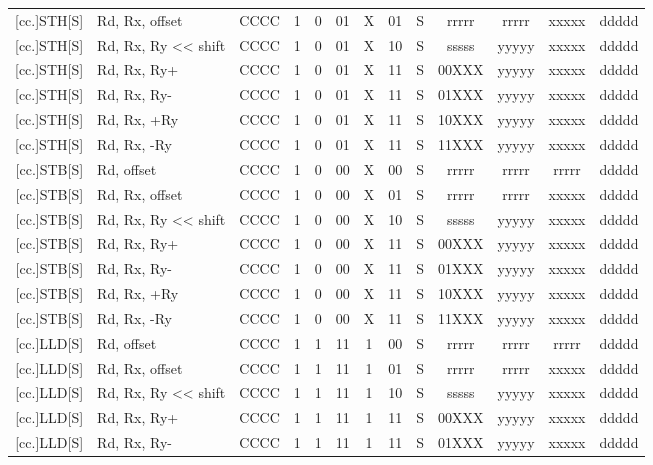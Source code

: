 \documentclass{article}
\begin{document}
\begin{longtable}{|r|l|c|c|c|c|c|c|c|ccc|c|}
        {[}cc.]STH[S] & Rd, Rx, offset & CCCC & 1 & 0 & 01 & X & 01 & S & rrrrr & rrrrr & xxxxx & ddddd \\
        {[}cc.]STH[S] & Rd, Rx, Ry << shift & CCCC & 1 & 0 & 01 & X & 10 & S & sssss & yyyyy & xxxxx & ddddd \\
        {[}cc.]STH[S] & Rd, Rx, Ry+ & CCCC & 1 & 0 & 01 & X & 11 & S & 00XXX & yyyyy & xxxxx & ddddd \\
        {[}cc.]STH[S] & Rd, Rx, Ry- & CCCC & 1 & 0 & 01 & X & 11 & S & 01XXX & yyyyy & xxxxx & ddddd \\
        {[}cc.]STH[S] & Rd, Rx, +Ry & CCCC & 1 & 0 & 01 & X & 11 & S & 10XXX & yyyyy & xxxxx & ddddd \\
        {[}cc.]STH[S] & Rd, Rx, -Ry & CCCC & 1 & 0 & 01 & X & 11 & S & 11XXX & yyyyy & xxxxx & ddddd \\
        \hline %
        \pagebreak
        {[}cc.]STB[S] & Rd, offset & CCCC & 1 & 0 & 00 & X & 00 & S & rrrrr & rrrrr & rrrrr & ddddd \\
        {[}cc.]STB[S] & Rd, Rx, offset & CCCC & 1 & 0 & 00 & X & 01 & S & rrrrr & rrrrr & xxxxx & ddddd \\
        {[}cc.]STB[S] & Rd, Rx, Ry << shift & CCCC & 1 & 0 & 00 & X & 10 & S & sssss & yyyyy & xxxxx & ddddd \\
        {[}cc.]STB[S] & Rd, Rx, Ry+ & CCCC & 1 & 0 & 00 & X & 11 & S & 00XXX & yyyyy & xxxxx & ddddd \\
        {[}cc.]STB[S] & Rd, Rx, Ry- & CCCC & 1 & 0 & 00 & X & 11 & S & 01XXX & yyyyy & xxxxx & ddddd \\
        {[}cc.]STB[S] & Rd, Rx, +Ry & CCCC & 1 & 0 & 00 & X & 11 & S & 10XXX & yyyyy & xxxxx & ddddd \\
        {[}cc.]STB[S] & Rd, Rx, -Ry & CCCC & 1 & 0 & 00 & X & 11 & S & 11XXX & yyyyy & xxxxx & ddddd \\
        \hline %
        {[}cc.]LLD[S] & Rd, offset & CCCC & 1 & 1 & 11 & 1 & 00 & S & rrrrr & rrrrr & rrrrr & ddddd \\
        {[}cc.]LLD[S] & Rd, Rx, offset & CCCC & 1 & 1 & 11 & 1 & 01 & S & rrrrr & rrrrr & xxxxx & ddddd \\
        {[}cc.]LLD[S] & Rd, Rx, Ry << shift & CCCC & 1 & 1 & 11 & 1 & 10 & S & sssss & yyyyy & xxxxx & ddddd \\
        {[}cc.]LLD[S] & Rd, Rx, Ry+ & CCCC & 1 & 1 & 11 & 1 & 11 & S & 00XXX & yyyyy & xxxxx & ddddd \\
        {[}cc.]LLD[S] & Rd, Rx, Ry- & CCCC & 1 & 1 & 11 & 1 & 11 & S & 01XXX & yyyyy & xxxxx & ddddd \\

\end{longtable}
\end{document}
